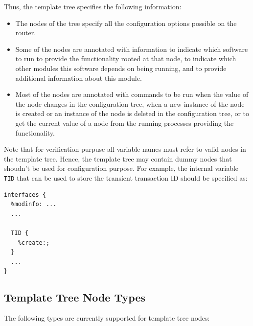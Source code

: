 \documentclass[11pt]{article}
\begin{document}
Thus, the template tree specifies the following information:

\begin{itemize}

  \item The nodes of the tree specify all the configuration options
  possible on the router.

  \item Some of the nodes are annotated with information to indicate
  which software to run to provide the functionality rooted at that
  node, to indicate which other modules this software depends on
  being running, and to provide additional information about this module.

  \item Most of the nodes are annotated with commands to be run when the
  value of the node changes in the configuration tree, when a new
  instance of the node is created or an instance of the node is deleted
  in the configuration tree, or to get the current value of a node from
  the running processes providing the functionality.

\end{itemize}

Note that for verification purpuse all variable names must refer to valid
nodes in the template tree. Hence, the template tree may contain dummy nodes
that shoudn't be used for configuration purpose. For example, the internal
variable {\tt TID} that can be used to store the transient transaction ID
should be specified as:

\begin{verbatim}
interfaces {
  %modinfo: ...
  ...

  TID {
    %create:;
  }
  ...
}

\end{verbatim}

\subsection{Template Tree Node Types}

The following types are currently supported for template tree nodes:
\end{document}
